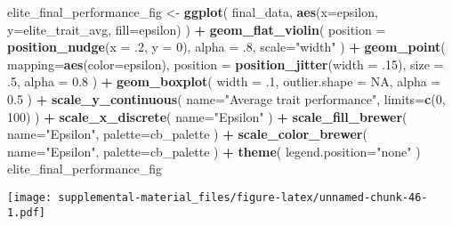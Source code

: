 \documentclass[]{book}
\newenvironment{Shaded}{\begin{snugshade}}{\end{snugshade}}
\newcommand{\DataTypeTok}[1]{\textcolor[rgb]{0.13,0.29,0.53}{#1}}
\newcommand{\DecValTok}[1]{\textcolor[rgb]{0.00,0.00,0.81}{#1}}
\newcommand{\FloatTok}[1]{\textcolor[rgb]{0.00,0.00,0.81}{#1}}
\newcommand{\KeywordTok}[1]{\textcolor[rgb]{0.13,0.29,0.53}{\textbf{#1}}}
\newcommand{\NormalTok}[1]{#1}
\newcommand{\OperatorTok}[1]{\textcolor[rgb]{0.81,0.36,0.00}{\textbf{#1}}}
\newcommand{\OtherTok}[1]{\textcolor[rgb]{0.56,0.35,0.01}{#1}}
\newcommand{\StringTok}[1]{\textcolor[rgb]{0.31,0.60,0.02}{#1}}
\begin{document}
\begin{Shaded}
\begin{Highlighting}[]
\NormalTok{elite_final_performance_fig <-}\StringTok{ }\KeywordTok{ggplot}\NormalTok{(}
\NormalTok{    final_data,}
    \KeywordTok{aes}\NormalTok{(}\DataTypeTok{x=}\NormalTok{epsilon, }\DataTypeTok{y=}\NormalTok{elite_trait_avg, }\DataTypeTok{fill=}\NormalTok{epsilon)}
\NormalTok{  ) }\OperatorTok{+}
\StringTok{  }\KeywordTok{geom_flat_violin}\NormalTok{(}
    \DataTypeTok{position =} \KeywordTok{position_nudge}\NormalTok{(}\DataTypeTok{x =} \FloatTok{.2}\NormalTok{, }\DataTypeTok{y =} \DecValTok{0}\NormalTok{),}
    \DataTypeTok{alpha =} \FloatTok{.8}\NormalTok{,}
    \DataTypeTok{scale=}\StringTok{"width"}
\NormalTok{  ) }\OperatorTok{+}
\StringTok{  }\KeywordTok{geom_point}\NormalTok{(}
    \DataTypeTok{mapping=}\KeywordTok{aes}\NormalTok{(}\DataTypeTok{color=}\NormalTok{epsilon),}
    \DataTypeTok{position =} \KeywordTok{position_jitter}\NormalTok{(}\DataTypeTok{width =} \FloatTok{.15}\NormalTok{),}
    \DataTypeTok{size =} \FloatTok{.5}\NormalTok{,}
    \DataTypeTok{alpha =} \FloatTok{0.8}
\NormalTok{  ) }\OperatorTok{+}
\StringTok{  }\KeywordTok{geom_boxplot}\NormalTok{(}
    \DataTypeTok{width =} \FloatTok{.1}\NormalTok{,}
    \DataTypeTok{outlier.shape =} \OtherTok{NA}\NormalTok{,}
    \DataTypeTok{alpha =} \FloatTok{0.5}
\NormalTok{  ) }\OperatorTok{+}
\StringTok{  }\KeywordTok{scale_y_continuous}\NormalTok{(}
    \DataTypeTok{name=}\StringTok{"Average trait performance"}\NormalTok{,}
    \DataTypeTok{limits=}\KeywordTok{c}\NormalTok{(}\DecValTok{0}\NormalTok{, }\DecValTok{100}\NormalTok{)}
\NormalTok{  ) }\OperatorTok{+}
\StringTok{  }\KeywordTok{scale_x_discrete}\NormalTok{(}
    \DataTypeTok{name=}\StringTok{"Epsilon"}
\NormalTok{  ) }\OperatorTok{+}
\StringTok{  }\KeywordTok{scale_fill_brewer}\NormalTok{(}
    \DataTypeTok{name=}\StringTok{"Epsilon"}\NormalTok{,}
    \DataTypeTok{palette=}\NormalTok{cb_palette}
\NormalTok{  ) }\OperatorTok{+}
\StringTok{  }\KeywordTok{scale_color_brewer}\NormalTok{(}
    \DataTypeTok{name=}\StringTok{"Epsilon"}\NormalTok{,}
    \DataTypeTok{palette=}\NormalTok{cb_palette}
\NormalTok{  ) }\OperatorTok{+}
\StringTok{  }\KeywordTok{theme}\NormalTok{(}
    \DataTypeTok{legend.position=}\StringTok{"none"}
\NormalTok{  )}
\NormalTok{elite_final_performance_fig}
\end{Highlighting}
\end{Shaded}

\texttt{[image: supplemental-material\_files/figure-latex/unnamed-chunk-46-1.pdf]}
\end{document}

